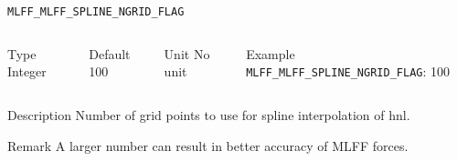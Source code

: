 \begin{frame}[allowframebreaks]{\texttt{{MLFF\_MLFF\_SPLINE\_NGRID\_FLAG}}} \label{MLFF_MLFF_SPLINE_NGRID_FLAG_FORCE}
\vspace*{-12pt}
\begin{columns}
\begin{block}{Type}
Integer
\end{block}

\begin{block}{Default}
100
\end{block}

\begin{block}{Unit}
No unit
\end{block}

\begin{block}{Example}
\texttt{MLFF\_MLFF\_SPLINE\_NGRID\_FLAG}: 100
\end{block}
\end{columns}

\begin{block}{Description}
 Number of grid points to use for spline interpolation of hnl.
\end{block}

\begin{block}{Remark}
A larger number can result in better accuracy of MLFF forces.
\end{block}
\end{frame}


